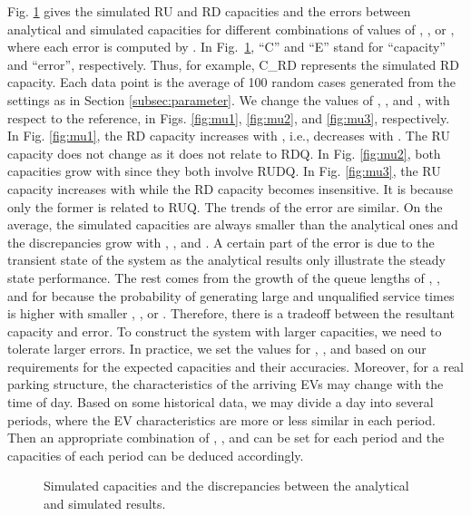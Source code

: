 \documentclass[journal]{IEEEtran}
\begin{document}
Fig. \ref{fig:scm_all} gives the simulated RU and RD capacities and the errors between analytical and simulated capacities for different combinations of values of , , or , where each error is computed by .
In Fig.~\ref{fig:scm_all}, ``C'' and ``E'' stand for ``capacity'' and ``error'', respectively. Thus, for example, C\_RD represents the simulated RD capacity. Each data point is the average of 100 random cases generated from the settings as in Section \ref{subsec:parameter}. We change the values of , , and , with respect to the reference, in Figs. \ref{fig:mu1}, \ref{fig:mu2}, and \ref{fig:mu3}, respectively. 
In Fig. \ref{fig:mu1}, the RD capacity increases with , i.e., decreases with . The RU capacity does not change as it does not relate to RDQ. In Fig. \ref{fig:mu2}, both capacities grow with  since they both involve RUDQ. In Fig. \ref{fig:mu3}, the RU capacity increases with  while the RD capacity becomes insensitive. It is because only the former is related to RUQ.
The trends of the error are similar. On the average, the simulated capacities are always smaller than the analytical ones and the discrepancies grow with , , and . 
A certain part of the error is due to the transient state of the system as the analytical results only illustrate the steady state performance.
The rest comes from the growth of the queue lengths of , , and  for  because the probability of generating large and unqualified service times is higher with smaller , , or . 
Therefore, there is a tradeoff between the resultant capacity and error. To construct the system with larger capacities, we need to tolerate larger errors. In practice, we set the values for , , and  based on our requirements for the expected capacities and their accuracies.
Moreover, for a real parking structure, the characteristics of the arriving EVs may change with the time of day. Based on some historical data, we may divide a day into several periods, where the EV characteristics are more or less similar in each period. Then an appropriate combination of , , and  can be set for each period and the capacities of each period can be deduced accordingly.

\begin{figure}[!t]
	\begin{center}
	\end{center}
	\caption{Simulated capacities and the discrepancies between the analytical and simulated results.}
  \label{fig:scm_all}
\end{figure}
\end{document}
